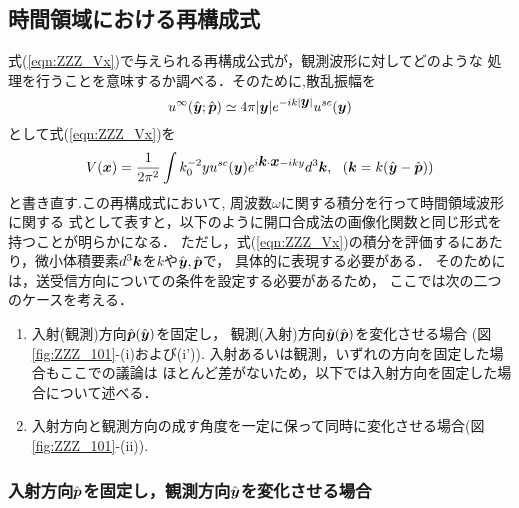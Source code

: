 \subsection{時間領域における再構成式}
式(\ref{eqn:ZZZ_Vx})で与えられる再構成公式が，観測波形に対してどのような
処理を行うことを意味するか調べる．そのために,散乱振幅を
\begin{equation}
	u^{\infty}(\hat{\mbox{\boldmath $y$}};\hat{\mbox{\boldmath $p$}}) 
	\simeq 
	4\pi |\mbox{\boldmath $y$}|e^{-ik|\mbox{\boldmath $y$}|} u^{sc}(\mbox{\boldmath $y$})
	\label{eqn:ZZZ_21}
\end{equation}
として式(\ref{eqn:ZZZ_Vx})を
\begin{equation}
	V(\mbox{\boldmath $x$}) =\frac{1}{2\pi^2} \int k_0^{-2} yu^{sc}(\mbox{\boldmath $y$})
	e^{i\mbox{\boldmath $k$}\cdot \mbox{\boldmath $x$}-iky}d^3\mbox{\boldmath $k$}, 
	\ \ (\mbox{\boldmath $k$}=k(\hat{\mbox{\boldmath $y$}}-\hat{\mbox{\boldmath $p$}}))
	\label{eqn:ZZZ_Vx_usc}
\end{equation}
と書き直す.この再構成式において, 周波数$\omega$に関する積分を行って時間領域波形に関する
式として表すと，以下のように開口合成法の画像化関数と同じ形式を持つことが明らかになる．
ただし，式(\ref{eqn:ZZZ_Vx})の積分を評価するにあたり，微小体積要素$d^3\mbox{\boldmath $k$}$を$k$や$\hat{\mbox{\boldmath $y$}},\hat{\mbox{\boldmath $p$}}$で，
具体的に表現する必要がある． そのためには，送受信方向についての条件を設定する必要があるため，
ここでは次の二つのケースを考える．
\begin{enumerate}
\item
	入射(観測)方向$\hat{\mbox{\boldmath $p$}}(\hat{\mbox{\boldmath $y$}})$を固定し，
	観測(入射)方向$\hat{\mbox{\boldmath $y$}}(\hat{\mbox{\boldmath $p$}})$を変化させる場合
		(図\ref{fig:ZZZ_101}-(i)および(i')).
	入射あるいは観測，いずれの方向を固定した場合もここでの議論は
	ほとんど差がないため，以下では入射方向を固定した場合について述べる．
\item
	入射方向と観測方向の成す角度を一定に保って同時に変化させる場合(図\ref{fig:ZZZ_101}-(ii)).
\end{enumerate}
\subsubsection{
	入射方向$\hat{\mbox{\boldmath $p$}}$を固定し，観測方向$\hat{\mbox{\boldmath $y$}}$を変化させる場合
}

